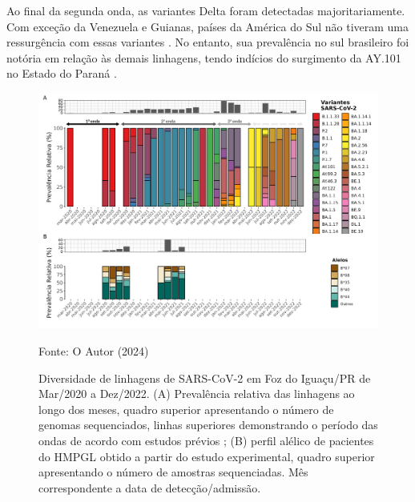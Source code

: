 \begin{justifying}
Ao final da segunda onda, as variantes Delta foram detectadas majoritariamente. Com exceção da Venezuela e Guianas, países da América do Sul não tiveram uma ressurgência com essas variantes \cite{Graf:2024}. No entanto, sua prevalência no sul brasileiro foi notória em relação às demais linhagens, tendo indícios do surgimento da AY.101 no Estado do Paraná \cite{Arantes:2022}.

\begin{figure}
    \centering
    \caption{\justifying Diversidade de linhagens de SARS-CoV-2 em Foz do Iguaçu/PR de Mar/2020 a Dez/2022. (A) Prevalência relativa das linhagens ao longo dos meses, quadro superior apresentando o número de genomas sequenciados, linhas superiores demonstrando o período das ondas de acordo com estudos prévios \cite{Bastos:2021, Giovanetti:2022, Graf:2024, Moura:2022}; (B) perfil alélico de pacientes do HMPGL obtido a partir do estudo experimental, quadro superior apresentando o número de amostras sequenciadas. Mês correspondente a data de detecção/admissão.}
    \includegraphics[width=1\textwidth]{Figuras/fig7.png}
    \label{fig:fig7}
    \begin{minipage}{0.8\textwidth} %
        \centering
        \footnotesize Fonte: O Autor (2024)
    \end{minipage}
\end{figure}

\begin{figure}
\end{figure}

\vspace{10mm}


\end{justifying}
